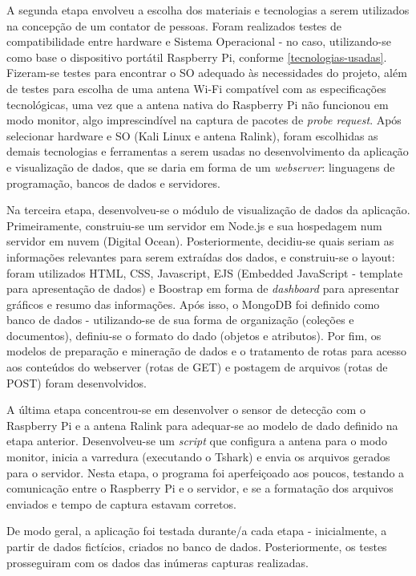 A segunda etapa envolveu a escolha dos materiais e tecnologias a serem
utilizados na concepção de um contator de pessoas. Foram realizados testes de
compatibilidade entre hardware e Sistema Operacional - no caso, utilizando-se
como base o dispositivo portátil Raspberry Pi, conforme
\autoref{tecnologias-usadas}. Fizeram-se testes para encontrar o SO adequado às
necessidades do projeto, além de testes para escolha de uma antena Wi-Fi
compatível com as especificações tecnológicas, uma vez que a antena nativa do
Raspberry Pi não funcionou em modo monitor, algo imprescindível na captura de
pacotes de \emph{probe request}. Após selecionar hardware e SO (Kali Linux e antena Ralink), foram escolhidas as demais
tecnologias e ferramentas a serem usadas no desenvolvimento da aplicação e
visualização de dados, que se daria em forma de um \emph{webserver}: linguagens
de programação, bancos de dados e servidores.

Na terceira etapa, desenvolveu-se o módulo de visualização de dados da aplicação.
Primeiramente, construiu-se um servidor em Node.js e sua hospedagem num servidor em nuvem (Digital Ocean). Posteriormente, decidiu-se quais seriam as informações relevantes para serem extraídas dos dados, e construiu-se o layout: foram utilizados HTML, CSS, Javascript, EJS (Embedded
JavaScript - template para apresentação de dados) e Boostrap em forma de
\emph{dashboard} para apresentar gráficos e resumo das informações. Após isso, o
MongoDB foi definido como banco de dados - utilizando-se de sua forma de
organização (coleções e documentos), definiu-se o formato do dado (objetos e
atributos). Por fim, os modelos de preparação e mineração  de dados e o
tratamento de rotas para acesso aos conteúdos do webserver (rotas de GET) e
postagem de arquivos (rotas de POST) foram desenvolvidos.

A última etapa concentrou-se em desenvolver o sensor de detecção com o
Raspberry Pi e a antena Ralink para adequar-se ao modelo de dado definido na
etapa anterior. Desenvolveu-se um \emph{script} que configura a antena para o
modo monitor, inicia a varredura (executando o Tshark) e envia os arquivos
gerados para o servidor. Nesta etapa, o programa foi aperfeiçoado aos poucos,
testando a comunicação entre o Raspberry Pi e o servidor, e se a formatação dos
arquivos enviados e tempo de captura estavam corretos.

De modo geral, a aplicação foi testada durante/a cada etapa - inicialmente,
a partir de dados fictícios, criados no banco de dados. Posteriormente, os testes
prosseguiram com os dados das inúmeras capturas realizadas.

